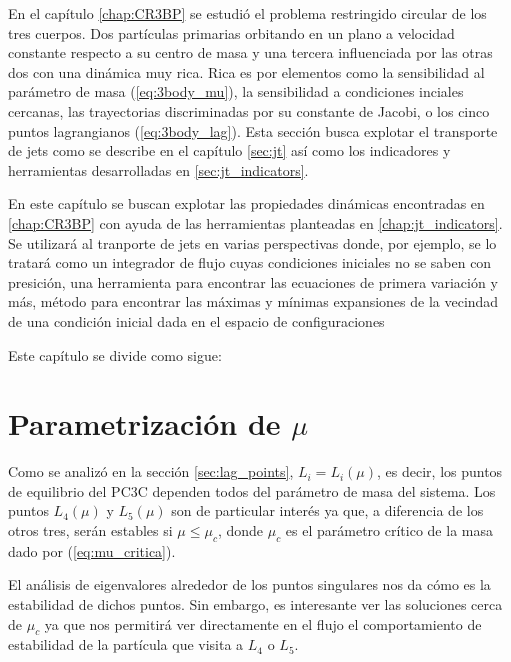 En el capítulo \ref{chap:CR3BP} se estudió el problema restringido circular de los tres cuerpos. Dos partículas primarias orbitando en un plano a velocidad constante respecto a su centro de masa y una tercera influenciada por las otras dos con una dinámica muy rica. Rica es por elementos como la sensibilidad al parámetro de masa (\ref{eq:3body_mu}), la sensibilidad a condiciones inciales cercanas, las trayectorias discriminadas por su constante de Jacobi, o los cinco puntos lagrangianos (\ref{eq:3body_lag}). Esta sección busca explotar el transporte de jets como se describe en el capítulo \ref{sec:jt} así como los indicadores y herramientas desarrolladas en \ref{sec:jt_indicators}.

En este capítulo se buscan explotar las propiedades dinámicas encontradas en \ref{chap:CR3BP} con ayuda de las herramientas planteadas en \ref{chap:jt_indicators}. Se utilizará al tranporte de jets en varias perspectivas donde, por ejemplo, se lo tratará como un integrador de flujo cuyas condiciones iniciales no se saben con presición, una herramienta para encontrar las ecuaciones de primera variación y más, método para encontrar las máximas y mínimas expansiones de la vecindad de una condición inicial dada en el espacio de configuraciones

Este capítulo se divide como sigue: 


\section{Parametrización de $\mu$}
Como se analizó en la sección \ref{sec:lag_points}, $L_i = L_i(\mu)$, es decir, los puntos de equilibrio del PC3C dependen todos del parámetro de masa del sistema. Los puntos $L_4(\mu)$ y $L_5(\mu)$ son de particular interés ya que, a diferencia de los otros tres, serán estables si $\mu \leq \mu_c$, donde $\mu_c$ es el parámetro crítico de la masa dado por (\ref{eq:mu_critica}). 

El análisis de eigenvalores alrededor de los puntos singulares nos da cómo es la estabilidad de dichos puntos. Sin embargo, es interesante ver las soluciones cerca de $\mu_c$ ya que nos permitirá ver directamente en el flujo el comportamiento de estabilidad de la partícula que visita a $L_4$ o $L_5$.

